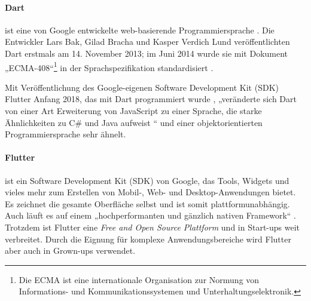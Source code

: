 \documentclass[10pt]{article}
\begin{document}
\paragraph{Dart} ist eine von Google entwickelte web-basierende Programmiersprache \cite[S. 6]{Meiller}.  Die Entwickler Lars Bak, Gilad Bracha und Kasper Verdich Lund veröffentlichten Dart erstmals am 14. November 2013; im Juni 2014 wurde sie mit Dokument „ECMA-408“\footnote{Die ECMA ist eine internationale Organisation zur Normung von Informations- und Kommunikationssystemen und Unterhaltungselektronik. } in der Sprachspezifikation standardisiert \cite[Geschichte]{Dewiki_Dart}.

Mit Veröffentlichung des Google-eigenen Software Development Kit (SDK) Flutter Anfang 2018, das mit Dart programmiert wurde \cite[Wofür wird Dart eingesetzt?]{Ionons_Dart}, „veränderte sich Dart von einer Art Erweiterung von JavaScript zu einer Sprache, die starke Ähnlichkeiten zu C\# und Java aufweist \cite{Marburger}“ und einer objektorientierten Programmiersprache sehr ähnelt.





\paragraph{Flutter}
 ist ein Software Development Kit (SDK) von Google, das Tools, Widgets und vieles mehr zum Erstellen von Mobil-, Web- und Desktop-Anwendungen bietet. 
Es zeichnet die gesamte Oberfläche selbst und ist somit plattformunabhängig. Auch läuft es auf einem „hochperformanten und gänzlich nativen Framework“ \cite[S. 21]{Marburger}. Trotzdem ist Flutter eine \textit{Free and Open Source Plattform} und in Start-ups weit verbreitet. Durch die Eignung für komplexe Anwendungsbereiche wird Flutter aber auch in Grown-ups verwendet. 
\end{document}
